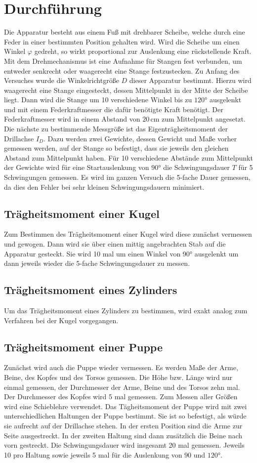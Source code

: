 \section{Durchführung}
\label{sec:Durchführung}
Die Apparatur besteht aus einem Fuß mit drehbarer Scheibe, welche durch eine Feder in einer bestimmten 
Position gehalten wird. Wird die Scheibe um einen Winkel $\varphi$ gedreht, so wirkt proportional zur Auslenkung 
eine rückstellende Kraft. Mit dem Drehmechanismus ist eine Aufnahme für Stangen fest verbunden, um entweder
senkrecht oder waagerecht eine Stange festzustecken.  
Zu Anfang des Versuches wurde die Winkelrichtgröße $D$ dieser Apparatur bestimmt. Hierzu wird waagerecht eine Stange 
eingesteckt, dessen Mittelpunkt in der Mitte der Scheibe liegt. Dann wird die Stange um 10 verschiedene Winkel bis zu 
$120°$ ausgelenkt und mit einem Federkraftmesser die dafür benötigte Kraft benötigt. Der Federkraftmesser wird 
in einem Abstand von $20$\,cm zum Mittelpunkt angesetzt. Die nächste zu bestimmende Messgröße ist das 
Eigenträgheitsmoment der Drillachse $I_D$. Dazu werden zwei Gewichte, dessen Gewicht und Maße vorher gemessen werden,
auf der Stange so befestigt, dass sie jeweils den gleichen Abstand zum Mittelpunkt haben.
Für 10 verschiedene Abstände zum Mittelpunkt der Gewichte wird für eine Startauslenkung 
von $90°$ die Schwingungsdauer $T$ für 5 Schwingungen gemessen. Es wird im ganzen Versuch die 5-fache Dauer gemessen, 
da dies den Fehler bei sehr kleinen Schwingungsdauern minimiert.
\subsection{Trägheitsmoment einer Kugel}
Zum Bestimmen des Trägheitsmoment einer Kugel wird diese zunächst vermessen und gewogen. Dann wird sie über einen mittig
angebrachten Stab auf die Apparatur gesteckt. Sie wird 10 mal um einen Winkel von 90° ausgelenkt um dann jeweils wieder 
die 5-fache Schwingungsdauer zu messen. 
\subsection{Trägheitsmoment eines Zylinders}
Um das Trägheitsmoment eines Zylinders zu bestimmen, wird exakt analog zum Verfahren bei der Kugel vorgegangen.
\subsection{Trägheitsmoment einer Puppe}
Zunächst wird auch die Puppe wieder vermessen. Es werden Maße der Arme, Beine, des Kopfes und des Torsos gemessen. Die 
Höhe bzw. Länge wird nur einmal gemessen, der Durchmesser der Arme, Beine und des Torsos zehn mal. Der Durchmesser des 
Kopfes wird 5 mal gemessen. Zum Messen aller Größen wird eine Schieblehre verwendet. Das Tägheitsmoment der Puppe wird 
mit zwei unterschiedlichen Haltungen der Puppe bestimmt. Sie ist so befestigt, als würde sie aufrecht auf der Drillachse 
stehen. In der ersten Position sind die Arme zur Seite ausgestreckt. In der zweiten Haltung sind dann zusätzlich die 
Beine nach vorn gestreckt. Die Schwingungsdauer wird insgesamt 20 mal gemessen. Jeweils 10 pro Haltung sowie jeweils 
5 mal für die Auslenkung von $90$ und $120°$.